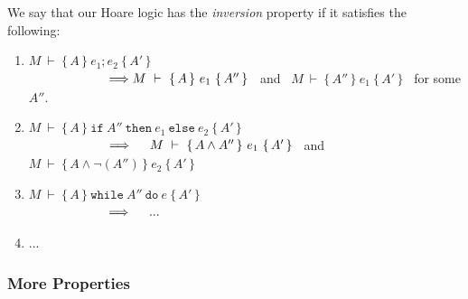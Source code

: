  
 \begin{definition}[Inversion] We say that our Hoare logic has the \emph{ inversion} property if it satisfies the  following:
 \begin{enumerate}
 \item
 $ M\ \vdash\  \{\, A \,  \}\ e_1; e_2 \  \{\, A' \, \}$\\
 $\strut \hspace{2cm}\ \Longrightarrow M\ \vdash\  \{\, A \,  \}\ e_1  \  \{\, A'' \, \}$ \ and \ $M\ \vdash\  \{\, A'' \,  \}\ e_1  \  \{\, A' \, \}$ \ for some $A''$.
 \item
 $ M\ \vdash\  \{\, A \,  \}\ \texttt{if}\ A''\ \texttt{then}\ e_1\ \texttt{else}\ e_2 \  \{\, A' \, \}$\\
 $\strut \hspace{2cm}\ \Longrightarrow
  \ \ \ \ M\ \vdash\  \{\, A\wedge A'' \,  \}\ e_1  \  \{\, A' \, \}$ \ and \ $M\ \vdash\  \{\, A\wedge \neg(A'') \,  \}\ e_2  \  \{\, A' \, \}$  
   \item
$ M\ \vdash\  \{\, A \,  \}\ \texttt{while}\ A''\ \texttt{do}\ e\  \{\, A' \, \}$\\
 $\strut \hspace{2cm}\ \Longrightarrow
  \ \ \ \ ... $  
   \item
...

 \end{enumerate}
 \end{definition}
 
 
 \subsubsection{More Properties}
 

